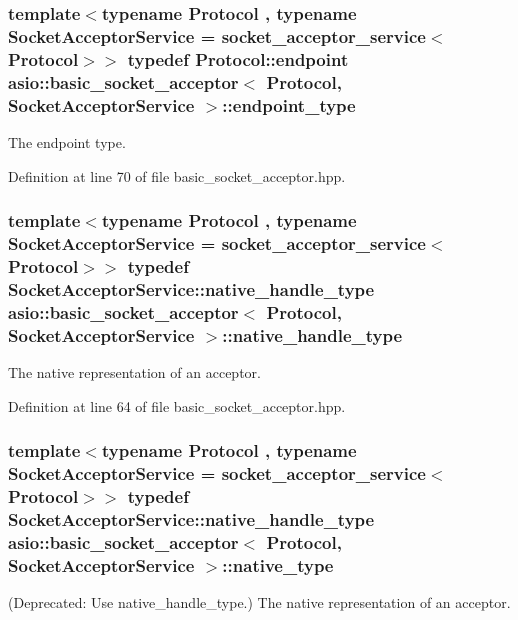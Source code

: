 \subsubsection[{endpoint\+\_\+type}]{\setlength{\rightskip}{0pt plus 5cm}template$<$typename Protocol , typename Socket\+Acceptor\+Service  = socket\+\_\+acceptor\+\_\+service$<$\+Protocol$>$$>$ typedef Protocol\+::endpoint {\bf asio\+::basic\+\_\+socket\+\_\+acceptor}$<$ Protocol, Socket\+Acceptor\+Service $>$\+::{\bf endpoint\+\_\+type}}\label{classasio_1_1basic__socket__acceptor_a393d69e2f8a370aaa13a9018af4c0048}


The endpoint type. 



Definition at line 70 of file basic\+\_\+socket\+\_\+acceptor.\+hpp.

\hypertarget{classasio_1_1basic__socket__acceptor_a6b3afaaad5c55272803ad5b911a00d35}{}
\subsubsection[{native\+\_\+handle\+\_\+type}]{\setlength{\rightskip}{0pt plus 5cm}template$<$typename Protocol , typename Socket\+Acceptor\+Service  = socket\+\_\+acceptor\+\_\+service$<$\+Protocol$>$$>$ typedef Socket\+Acceptor\+Service\+::native\+\_\+handle\+\_\+type {\bf asio\+::basic\+\_\+socket\+\_\+acceptor}$<$ Protocol, Socket\+Acceptor\+Service $>$\+::{\bf native\+\_\+handle\+\_\+type}}\label{classasio_1_1basic__socket__acceptor_a6b3afaaad5c55272803ad5b911a00d35}


The native representation of an acceptor. 



Definition at line 64 of file basic\+\_\+socket\+\_\+acceptor.\+hpp.

\hypertarget{classasio_1_1basic__socket__acceptor_a816fd87f40cd81374fa6b0c66e11006c}{}
\subsubsection[{native\+\_\+type}]{\setlength{\rightskip}{0pt plus 5cm}template$<$typename Protocol , typename Socket\+Acceptor\+Service  = socket\+\_\+acceptor\+\_\+service$<$\+Protocol$>$$>$ typedef Socket\+Acceptor\+Service\+::native\+\_\+handle\+\_\+type {\bf asio\+::basic\+\_\+socket\+\_\+acceptor}$<$ Protocol, Socket\+Acceptor\+Service $>$\+::{\bf native\+\_\+type}}\label{classasio_1_1basic__socket__acceptor_a816fd87f40cd81374fa6b0c66e11006c}
(Deprecated\+: Use native\+\_\+handle\+\_\+type.) The native representation of an acceptor. 

